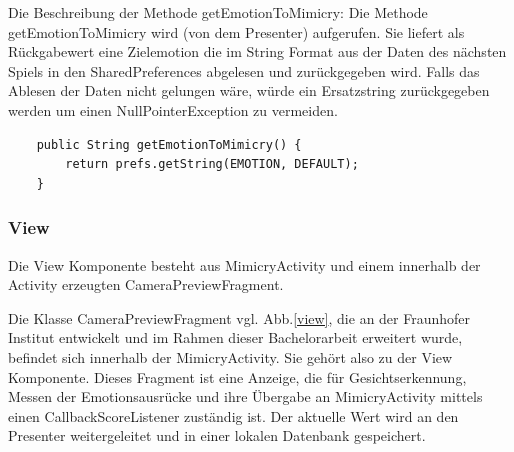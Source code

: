 Die Beschreibung der Methode getEmotionToMimicry:
Die Methode getEmotionToMimicry wird (von dem Presenter) aufgerufen. Sie liefert als Rückgabewert eine Zielemotion die im String Format aus der Daten des nächsten Spiels in den SharedPreferences abgelesen und zurückgegeben wird.
Falls das Ablesen der Daten nicht gelungen wäre, würde ein Ersatzstring zurückgegeben werden um einen NullPointerException zu vermeiden. 
\begin{verbatim}
    public String getEmotionToMimicry() {
        return prefs.getString(EMOTION, DEFAULT);
    } 
\end{verbatim}
\newpage
\subsubsection{View}
Die  View Komponente besteht aus MimicryActivity und einem innerhalb der Activity erzeugten CameraPreviewFragment. 

Die Klasse CameraPreviewFragment vgl. Abb.\ref{view}, die an der Fraunhofer Institut entwickelt und im Rahmen dieser Bachelorarbeit erweitert wurde, befindet sich innerhalb der MimicryActivity. Sie gehört also zu der View Komponente. Dieses Fragment ist eine Anzeige, die für Gesichtserkennung, Messen der Emotionsausrücke und ihre Übergabe an MimicryActivity mittels einen CallbackScoreListener zuständig ist. Der aktuelle Wert wird an den Presenter weitergeleitet und in einer lokalen Datenbank gespeichert.\\

